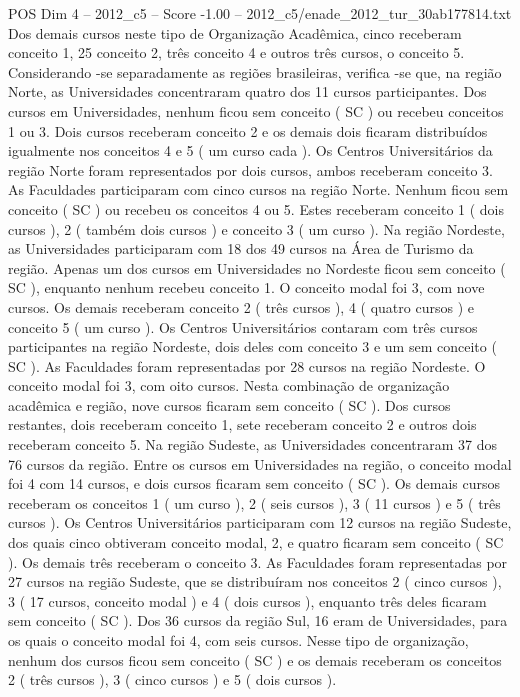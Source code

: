 \begin{textsample}{POS Dim 4 – 2012\_c5 – Score -1.00 – 2012\_c5/enade\_2012\_tur\_30ab177814.txt}
Dos demais cursos neste tipo de Organização Acadêmica, cinco receberam conceito 1, 25 conceito 2, três conceito 4 e outros três cursos, o conceito 5.
Considerando -se separadamente as regiões brasileiras, verifica -se que, na região Norte, as Universidades concentraram quatro dos 11 cursos participantes.
Dos cursos em Universidades, nenhum ficou sem conceito ( SC ) ou recebeu conceitos 1 ou 3.
Dois cursos receberam conceito 2 e os demais dois ficaram distribuídos igualmente nos conceitos 4 e 5 ( um curso cada ).
Os Centros Universitários da região Norte foram representados por dois cursos, ambos receberam conceito 3.
As Faculdades participaram com cinco cursos na região Norte.
Nenhum ficou sem conceito ( SC ) ou recebeu os conceitos 4 ou 5.
Estes receberam conceito 1 ( dois cursos ), 2 ( também dois cursos ) e conceito 3 ( um curso ).
Na região Nordeste, as Universidades participaram com 18 dos 49 cursos na Área de Turismo da região.
Apenas um dos cursos em Universidades no Nordeste ficou sem conceito ( SC ), enquanto nenhum recebeu conceito 1.
O conceito modal foi 3, com nove cursos.
Os demais receberam conceito 2 ( três cursos ), 4 ( quatro cursos ) e conceito 5 ( um curso ).
Os Centros Universitários contaram com três cursos participantes na região Nordeste, dois deles com conceito 3 e um sem conceito ( SC ).
As Faculdades foram representadas por 28 cursos na região Nordeste.
O conceito modal foi 3, com oito cursos.
Nesta combinação de organização acadêmica e região, nove cursos ficaram sem conceito ( SC ).
Dos cursos restantes, dois receberam conceito 1, sete receberam conceito 2 e outros dois receberam conceito 5.
Na região Sudeste, as Universidades concentraram 37 dos 76 cursos da região.
Entre os cursos em Universidades na região, o conceito modal foi 4 com 14 cursos, e dois cursos ficaram sem conceito ( SC ).
Os demais cursos receberam os conceitos 1 ( um curso ), 2 ( seis cursos ), 3 ( 11 cursos ) e 5 ( três cursos ).
Os Centros Universitários participaram com 12 cursos na região Sudeste, dos quais cinco obtiveram conceito modal, 2, e quatro ficaram sem conceito ( SC ).
Os demais três receberam o conceito 3.
As Faculdades foram representadas por 27 cursos na região Sudeste, que se distribuíram nos conceitos 2 ( cinco cursos ), 3 ( 17 cursos, conceito modal ) e 4 ( dois cursos ), enquanto três deles ficaram sem conceito ( SC ).
Dos 36 cursos da região Sul, 16 eram de Universidades, para os quais o conceito modal foi 4, com seis cursos.
Nesse tipo de organização, nenhum dos cursos ficou sem conceito ( SC ) e os demais receberam os conceitos 2 ( três cursos ), 3 ( cinco cursos ) e 5 ( dois cursos ).

\end{textsample}
